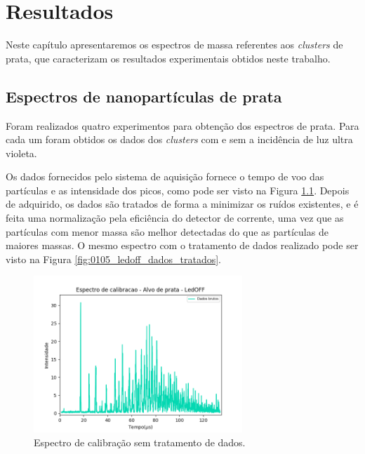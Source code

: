 \chapter{Resultados}
\label{resultados}

Neste capítulo apresentaremos os espectros de massa referentes aos \textit{clusters} de prata, que caracterizam os resultados experimentais obtidos neste trabalho.

\section{Espectros de nanopartículas de prata}
\label{sec:result_producao_cluster}
Foram realizados quatro experimentos para obtenção dos espectros de prata. Para cada um foram obtidos os dados dos \textit{clusters} com e sem a incidência de luz ultra violeta. 

Os dados fornecidos pelo sistema de aquisição
fornece o tempo de voo das partículas e as intensidade dos picos, como pode ser visto na Figura \ref{fig:ex_dados_brutos}. Depois de adquirido, os dados são tratados de forma a minimizar os ruídos existentes, e é feita uma normalização pela eficiência do detector de corrente, uma vez que as partículas com menor massa são melhor detectadas do que as partículas de maiores massas. O mesmo espectro com o tratamento de dados realizado pode ser visto na Figura \ref{fig:0105_ledoff_dados_tratados}.




\begin{figure}
  \centering  
  \includegraphics[width=0.7\textwidth]{exp_01/LedOFF_sem_tratamento.png}
  \caption{Espectro de calibração sem tratamento de dados.}
  \label{fig:ex_dados_brutos} 
\end{figure}


